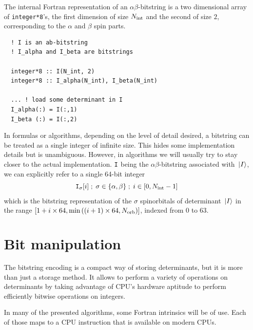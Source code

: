 \documentclass[./thesis.tex]{subfiles}
\begin{document}
The internal Fortran representation of an $\alpha \beta$-bitstring is a two dimensional array of \lstinline{integer*8}'s, the first dimension of size ${N_\text{int}}$ and the second of size $2$, corresponding to the $\alpha$ and $\beta$ spin parts.


\lstset{frame=single}
\begin{lstlisting}
  ! I is an ab-bitstring
  ! I_alpha and I_beta are bitstrings
  
  integer*8 :: I(N_int, 2)
  integer*8 :: I_alpha(N_int), I_beta(N_int)

  ... ! load some determinant in I
  I_alpha(:) = I(:,1)
  I_beta (:) = I(:,2)
\end{lstlisting}
\lstset{frame=none}


In formulas or algorithms, depending on the level of detail desired, a bitstring can be treated as a single integer of infinite size. This hides some implementation details but is unambiguous. However, in algorithms we will usually try to stay closer to the actual implementation. ${\texttt{I}}$ being the $\alpha \beta$-bitstring associated with ${\ket*{I}}$, we can explicitly refer to a single 64-bit integer
$${\texttt{I}}_{\sigma}[i]\; ;\; \sigma \in \{\alpha, \beta\}\; ;\; i \in [0, {N_\text{int}}-1]$$
which is the bitstring representation of the $\sigma$ spinorbitals of determinant ${\ket*{I}}$ in the range $[1+i \times 64, \min \left( (i+1) \times 64, {N_\text{orb}} \right)]$, indexed from $0$ to $63$.

      
\section{Bit manipulation}

The bitstring encoding is a compact way of storing determinants, but it is more than just a storage method. It allows to perform a variety of operations on determinants by taking advantage of CPU's hardware aptitude to perform efficiently bitwise operations on integers.

In many of the presented algorithms, some Fortran intrinsics will be of use. Each of those maps to a CPU instruction that is available on modern CPUs.

\end{document}
